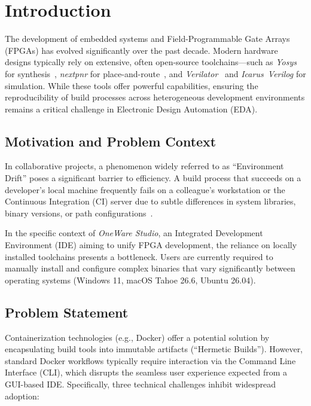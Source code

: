 
\chapter{Introduction}
\label{ch:introduction}

The development of embedded systems and Field-Programmable Gate Arrays (FPGAs) has evolved significantly over the past decade. Modern hardware designs typically rely on extensive, often open-source toolchains---such as \textit{Yosys} for synthesis~\cite{wolf2013yosys}, \textit{nextpnr} for place-and-route~\cite{shah2019nextpnr}, and \textit{Verilator}~\cite{snyder2004verilator} and \textit{Icarus~Verilog} for simulation. While these tools offer powerful capabilities, ensuring the reproducibility of build processes across heterogeneous development environments remains a critical challenge in Electronic Design Automation (EDA).

\section{Motivation and Problem Context}
In collaborative projects, a phenomenon widely referred to as ``Environment Drift'' poses a significant barrier to efficiency. A build process that succeeds on a developer's local machine frequently fails on a colleague's workstation or the Continuous Integration (CI) server due to subtle differences in system libraries, binary versions, or path configurations~\cite{courtes2013functional}.

In the specific context of \textit{OneWare Studio}, an Integrated Development Environment (IDE) aiming to unify FPGA development, the reliance on locally installed toolchains presents a bottleneck. Users are currently required to manually install and configure complex binaries that vary significantly between operating systems (Windows 11, macOS Tahoe 26.6, Ubuntu 26.04).

\section{Problem Statement}
Containerization technologies (e.g., Docker) offer a potential solution by encapsulating build tools into immutable artifacts (``Hermetic Builds''). However, standard Docker workflows typically require interaction via the Command Line Interface (CLI), which disrupts the seamless user experience expected from a GUI-based IDE. Specifically, three technical challenges inhibit widespread adoption:

